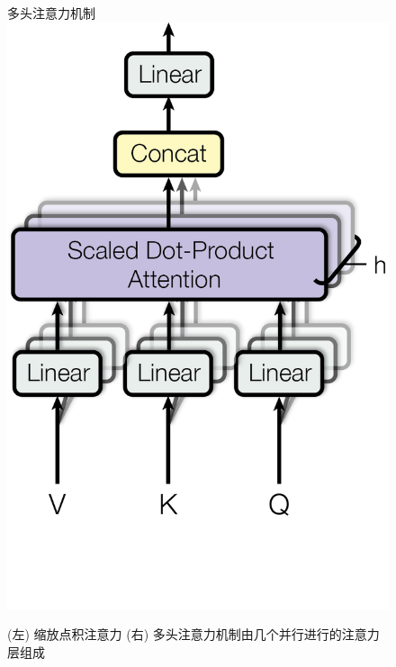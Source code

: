 \begin{figure}
\begin{minipage}[t]{0.5\textwidth}
  多头注意力机制 \\
  \vspace{0.1cm}
  \includegraphics[scale=0.6]{Figures/ModalNet-20}  
\end{minipage}



  \caption{(左) 缩放点积注意力 (右) 多头注意力机制由几个并行进行的注意力层组成}
  \label{fig:multi-head-att}
\end{figure}


